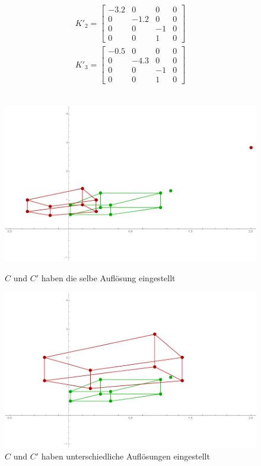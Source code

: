 \begin{gather}
K'_2 = \begin{bmatrix}
-3.2&0&0&0\\
0&-1.2&0&0\\
0&0&-1&0\\
0&0&1&0
\end{bmatrix}\\
K'_3 = \begin{bmatrix}
-0.5&0&0&0\\
0&-4.3&0&0\\
0&0&-1&0\\
0&0&1&0
\end{bmatrix}
\end{gather}\\


\begin{figure}[!htb]
	\includegraphics[width=\linewidth]{images/Zeta1.png}
	\caption{$C$ und $C'$ haben die selbe Auflösung eingestellt}
	\label{fig:awesome_image1}
	\endminipage\hfill
	\includegraphics[width=\linewidth]{images/Zeta2.png}
	\caption{$C$ und $C'$ haben unterschiedliche Auflösungen eingestellt}
	\label{fig:awesome_image2}
	\endminipage\hfill
\end{figure}

